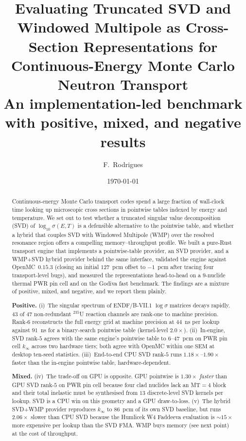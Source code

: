 \documentclass[11pt,a4paper]{article}
\begin{document}
\title{Evaluating Truncated SVD and Windowed Multipole as
Cross-Section Representations for Continuous-Energy Monte
Carlo Neutron Transport\\
\large An implementation-led benchmark with positive, mixed,
and negative results}

\author{F.~Rodrigues}
\date{\today}
\maketitle

\begin{abstract}
Continuous-energy Monte Carlo transport codes spend a large
fraction of wall-clock time looking up microscopic cross
sections in pointwise tables indexed by energy and temperature.
We set out to test whether a truncated singular value
decomposition (SVD) of $\log_{10} \sigma(E, T)$ is a
defensible alternative to the pointwise table, and whether a
hybrid that couples SVD with Windowed Multipole (WMP) over the
resolved resonance region offers a compelling
memory--throughput profile. We built a pure-Rust transport
engine that implements a pointwise-table provider, an SVD
provider, and a WMP+SVD hybrid provider behind the same
interface, validated the engine against OpenMC~$0.15.3$
(closing an initial $127$~pcm offset to $-1$~pcm after tracing
four transport-level bugs), and measured the representations
head-to-head on a $9$-nuclide thermal PWR pin cell and on the
Godiva fast benchmark. The findings are a mixture of
positive, mixed, and negative, and we report them plainly.

\textbf{Positive.}
(i)~The singular spectrum of ENDF/B-VII.1 $\log\sigma$
matrices decays rapidly. $43$ of $47$ non-redundant $^{235}$U
reaction channels are rank-one to machine precision.
Rank-$6$ reconstructs the full energy grid at machine precision
at $44$~ns per lookup against $91$~ns for a binary-search
pointwise table (kernel-level $2.0\times$).
(ii)~In-engine, SVD rank-$5$ agrees with the same engine's
pointwise table to $6$--$47$~pcm on PWR pin cell $k_\infty$
across two hardware tiers; both agree with OpenMC within one
$\mathrm{SEM}$ at desktop ten-seed statistics.
(iii)~End-to-end CPU SVD rank-$5$ runs $1.18\times$--$1.90\times$
faster than the in-engine pointwise table, hardware-dependent.

\textbf{Mixed.}
(iv)~The trade-off on GPU is opposite. GPU pointwise is
$1.30\times$ \emph{faster} than GPU SVD rank-$5$ on PWR pin
cell because four clad nuclides lack an MT$=4$ block and
their total inelastic must be synthesised from $13$
discrete-level SVD kernels per lookup. SVD is a CPU win on
this geometry and a GPU draw-to-loss.
(v)~The hybrid SVD+WMP provider reproduces $k_\infty$ to
$86$~pcm of its own SVD baseline, but runs $2.06\times$
slower than CPU SVD because the Humlicek W4 Faddeeva
evaluation is $\sim\!15\times$ more expensive per lookup than
the SVD FMA. WMP buys memory (see next point) at the cost of
throughput.


\end{abstract}
\end{document}
